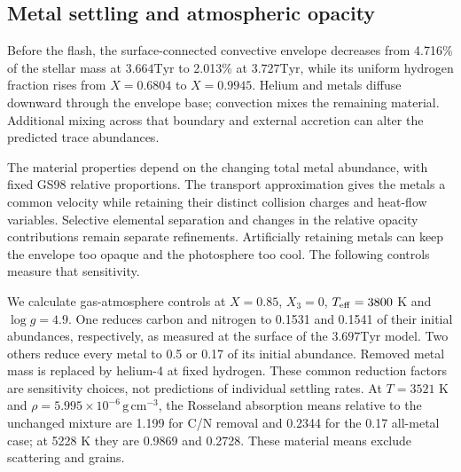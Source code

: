 \documentclass[11pt,letterpaper]{article}
\newcommand{\Tyr}{\mathrm{Tyr}}
\begin{document}
\subsection{Metal settling and atmospheric opacity}
Before the flash, the surface-connected convective envelope decreases from
4.716\% of the stellar mass at $3.664\Tyr$ to 2.013\% at $3.727\Tyr$,
while its uniform hydrogen fraction rises from $X=0.6804$ to $X=0.9945$.
Helium and metals diffuse downward through the envelope base; convection
mixes the remaining material. Additional mixing across that boundary and
external accretion can alter the predicted trace abundances.

The material properties depend on the changing total metal abundance,
with fixed GS98 relative proportions. The transport approximation gives the
metals a common velocity while retaining their distinct collision charges
and heat-flow variables. Selective elemental separation and changes in the
relative opacity contributions remain separate refinements. Artificially
retaining metals can keep the envelope too opaque and the photosphere too
cool. The following controls measure that sensitivity.

We calculate gas-atmosphere controls at $X=0.85$, $X_3=0$,
$T_{\rm eff}=3800$ K and $\log g=4.9$. One reduces carbon and nitrogen
to 0.1531 and 0.1541 of their initial abundances, respectively, as measured
at the surface of the $3.697\Tyr$ model. Two others reduce every metal to
0.5 or 0.17 of its initial abundance. Removed metal mass is replaced by
helium-4 at fixed hydrogen. These common reduction factors are sensitivity
choices, not predictions of individual settling rates. At
$T=3521$ K and $\rho=5.995\times10^{-6}\,\mathrm{g\,cm^{-3}}$, the
Rosseland absorption means relative to the unchanged mixture are 1.199
for C/N removal and 0.2344 for the 0.17 all-metal case; at 5228 K they
are 0.9869 and 0.2728. These material means exclude scattering and grains.
\end{document}

